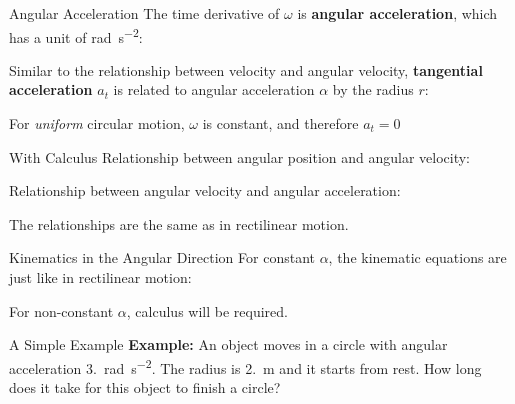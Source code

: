 \documentclass[12pt,compress,aspectratio=169]{beamer}
\begin{document}
\begin{frame}{Angular Acceleration}
  The time derivative of $\omega$ is \textbf{angular acceleration}, which
  has a unit of \si{\radian\per\second\squared}:


  Similar to the relationship between velocity and angular velocity,
  \textbf{tangential acceleration} $a_t$ is related to angular acceleration
  $\alpha$ by the radius $r$:
    
    
  For \emph{uniform} circular motion, $\omega$ is constant, and therefore
  $a_t=0$
\end{frame}



\begin{frame}{With Calculus}
  Relationship between angular position and angular velocity:


  Relationship between angular velocity and angular acceleration:


  The relationships are the same as in rectilinear motion.
\end{frame}




\begin{frame}{Kinematics in the Angular Direction}
  For constant $\alpha$, the kinematic equations are just like in rectilinear
  motion:

  
  For non-constant $\alpha$, calculus will be required.
\end{frame}



\begin{frame}{A Simple Example}
  \textbf{Example:} An object moves in a circle with angular acceleration
  \SI{3.}{\radian\per\second\squared}. The radius is \SI{2.}{\metre} and it
  starts from rest. How long does it take for this object to finish a circle?
\end{frame}
\end{document}
